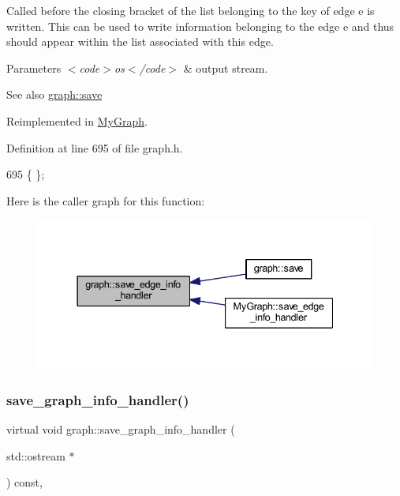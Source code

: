Called before the closing bracket of the list belonging to the key of edge {\ttfamily e} is written. This can be used to write information belonging to the edge {\ttfamily e} and thus should appear within the list associated with this edge.


\begin{DoxyParams}{Parameters}
{\em $<$code$>$os$<$/code$>$} & output stream. \\
\hline
\end{DoxyParams}
\begin{DoxySeeAlso}{See also}
\mbox{\hyperlink{classgraph_a7bd0712a528249d1585085a64ac3e661}{graph\+::save}} 
\end{DoxySeeAlso}


Reimplemented in \mbox{\hyperlink{class_my_graph_aa2c8ff76d5443d4788ecfebc8f799182}{My\+Graph}}.



Definition at line 695 of file graph.\+h.


\begin{DoxyCode}
695 \{ \};
\end{DoxyCode}
Here is the caller graph for this function\+:\nopagebreak
\begin{figure}[H]
\begin{center}
\leavevmode
\includegraphics[width=337pt]{classgraph_a37bb8d0951691e37cdfb271229960f9c_icgraph}
\end{center}
\end{figure}
\mbox{\label{classgraph_a0f20022d6f4951b8836a204aa85b7693}} 
\subsubsection{\texorpdfstring{save\+\_\+graph\+\_\+info\+\_\+handler()}{save\_graph\_info\_handler()}}
{\footnotesize\ttfamily virtual void graph\+::save\+\_\+graph\+\_\+info\+\_\+handler (\begin{DoxyParamCaption}\item[{std\+::ostream $\ast$}]{ }\end{DoxyParamCaption}) const\hspace{0.3cm}{\ttfamily [inline]}, {\ttfamily [virtual]}}

